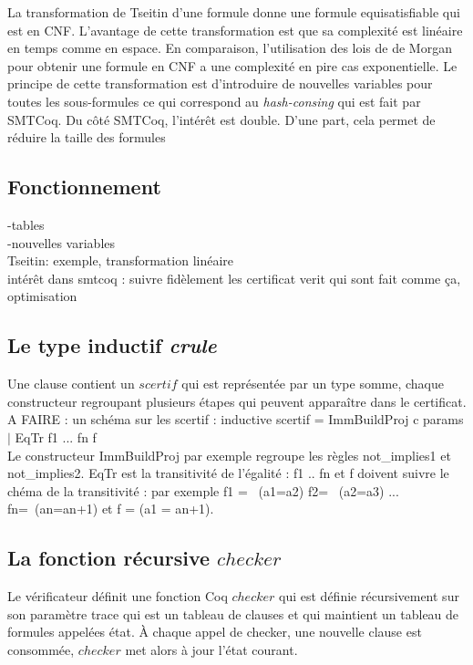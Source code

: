 \documentclass[11pt]{article}
\begin{document}
La transformation de Tseitin d'une formule donne une formule equisatisfiable qui est en CNF. L'avantage de cette transformation est que sa complexité est linéaire en temps comme en espace. En comparaison, l'utilisation des lois de de Morgan pour obtenir une formule en CNF a une complexité en pire cas exponentielle. Le principe de cette transformation est d'introduire de nouvelles variables pour toutes les sous-formules ce qui correspond au \textit{hash-consing} qui est fait par SMTCoq. Du côté SMTCoq, l'intérêt est double. D'une part, cela permet de réduire la taille des formules

\subsection{Fonctionnement}

-tables \\
-nouvelles variables\\
Tseitin: exemple, transformation linéaire\\
intérêt dans smtcoq : suivre fidèlement les certificat verit qui sont fait comme ça,
optimisation



 \subsection{Le type inductif \textit{crule}}\label{regroupement}



Une clause contient un $scertif$  qui est représentée par un type somme, chaque constructeur regroupant plusieurs étapes qui peuvent apparaître dans le certificat.\\

A FAIRE : un schéma sur les scertif :  inductive scertif = ImmBuildProj c params $|$ EqTr f1 ... fn f \\

Le constructeur ImmBuildProj par exemple regroupe les règles not\_implies1 et not\_implies2. EqTr est la transitivité de l'égalité : f1 .. fn et f doivent suivre le chéma de la transitivité : par exemple f1 = ~(a1=a2) f2= ~(a2=a3) ... fn=~(an=a{n+1}) et f = (a1 = a{n+1}).\\

\subsection{La fonction récursive $checker$} 
Le vérificateur définit une fonction Coq $checker$ qui est définie récursivement sur son paramètre trace qui est un tableau de clauses et qui maintient un tableau de formules appelées état. À chaque appel de checker, une nouvelle clause est consommée, $checker$ met alors à jour l'état courant.\\
\end{document}
